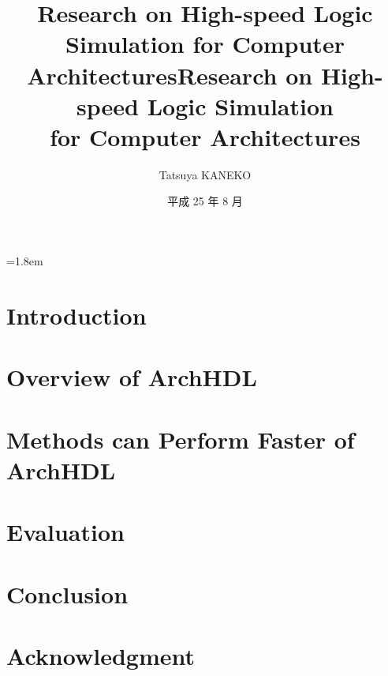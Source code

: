 \documentclass[12pt,openany,papersize,english]{jsbook}
\title{Research on High-speed Logic Simulation for Computer Architectures}
\affiliation{Department of Computer Science}
\title{Research on High-speed Logic Simulation \\ for Computer Architectures}
\author{Tatsuya KANEKO}
\date{平成 25 年 8 月}
\begin{document}
\maketitle
\parindent=1.8em
\frontmatter

\tableofcontents

\mainmatter

\frenchspacing
\sloppy

\chapter{Introduction}




% 

\chapter{Overview of ArchHDL}

\label{c:summary}



\chapter{Methods can Perform Faster of ArchHDL}

\label{c:method}



\chapter{Evaluation}

\label{c:evaluation}



\chapter{Conclusion}

\label{c:conclusion}



\backmatter

\nonfrenchspacing

\chapter{Acknowledgment}

\label{c:acknowledgment}



\label{c:relatedwork}


\end{document}
